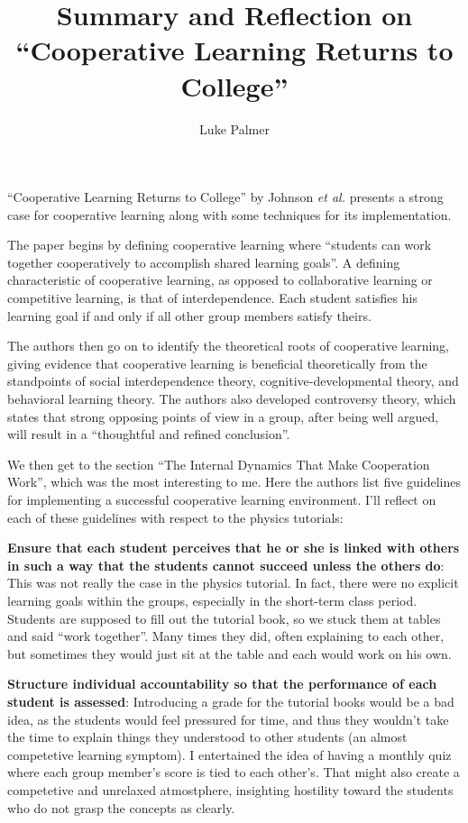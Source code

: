 \documentclass[12pt]{article}
\title{Summary and Reflection on ``Cooperative Learning Returns to College''}
\author{Luke Palmer}
\begin{document}
\maketitle

``Cooperative Learning Returns to College'' by Johnson \textit{et
al.} presents a strong case for cooperative learning along with some
techniques for its implementation.  

The paper begins by defining cooperative learning where ``students can
work together cooperatively to accomplish shared learning goals''.  A
defining characteristic of cooperative learning, as opposed to
collaborative learning or competitive learning, is that of
interdependence.  Each student satisfies his learning goal if and only
if all other group members satisfy theirs.  

The authors then go on to identify the theoretical roots of cooperative
learning, giving evidence that cooperative learning is beneficial
theoretically from the standpoints of social interdependence theory,
cognitive-developmental theory, and behavioral learning theory.  The
authors also developed controversy theory, which states that strong
opposing points of view in a group, after being well argued, will result
in a ``thoughtful and refined conclusion''.

We then get to the section ``The Internal Dynamics That Make Cooperation
Work'', which was the most interesting to me.  Here the authors list
five guidelines for implementing a successful cooperative learning
environment.  I'll reflect on each of these guidelines with respect to
the physics tutorials:

\textbf{Ensure that each student perceives that he or she is linked with
others in such a way that the students cannot succeed unless the others
do}:  This was not really the case in the physics tutorial.  In fact,
there were no explicit learning goals within the groups, especially in
the short-term class period.  Students are supposed to fill out the
tutorial book, so we stuck them at tables and said ``work together''.
Many times they did, often explaining to each other, but sometimes they
would just sit at the table and each would work on his own.

\textbf{Structure individual accountability so that the performance of
each student is assessed}: Introducing a grade for the tutorial books
would be a bad idea, as the students would feel pressured for time, and
thus they wouldn't take the time to explain things they understood to
other students (an almost competetive learning symptom).  I entertained
the idea of having a monthly quiz where each group member's score is
tied to each other's.  That might also create a competetive and
unrelaxed atmostphere, insighting hostility toward the students who do
not grasp the concepts as clearly.
\end{document}
